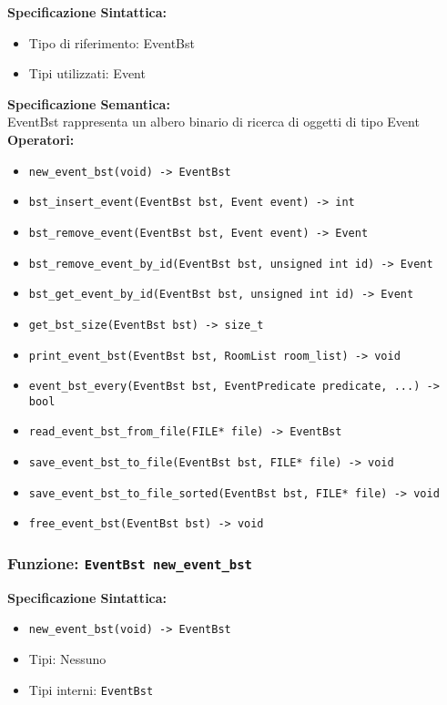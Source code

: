 \documentclass[11pt]{scrartcl} %
\begin{document}
\textbf{Specificazione Sintattica:}
\begin{itemize}
	\item Tipo di riferimento: EventBst
	\item Tipi utilizzati: Event
\end{itemize}
\textbf{Specificazione Semantica:} \\
EventBst rappresenta un albero binario di ricerca di oggetti di tipo Event\\

\textbf{Operatori:}
\begin{itemize}
    \item \texttt{new\_event\_bst(void) -> EventBst}
    \item \texttt{bst\_insert\_event(EventBst bst, Event event) -> int}
    \item \texttt{bst\_remove\_event(EventBst bst, Event event) -> Event}
    \item \texttt{bst\_remove\_event\_by\_id(EventBst bst, unsigned int id) -> Event}
    \item \texttt{bst\_get\_event\_by\_id(EventBst bst, unsigned int id) -> Event}
    \item \texttt{get\_bst\_size(EventBst bst) -> size\_t}
    \item \texttt{print\_event\_bst(EventBst bst, RoomList room\_list) -> void}
    \item \texttt{event\_bst\_every(EventBst bst, EventPredicate predicate, ...) -> bool}
    \item \texttt{read\_event\_bst\_from\_file(FILE* file) -> EventBst}
    \item \texttt{save\_event\_bst\_to\_file(EventBst bst, FILE* file) -> void}
    \item \texttt{save\_event\_bst\_to\_file\_sorted(EventBst bst, FILE* file) -> void}
    \item \texttt{free\_event\_bst(EventBst bst) -> void}
\end{itemize}


\subsubsection{Funzione: \texttt{EventBst new\_event\_bst}}

\textbf{Specificazione Sintattica:}
\begin{itemize}
\item \texttt{new\_event\_bst(void) -> EventBst}
\item Tipi: Nessuno
\item Tipi interni: \texttt{EventBst}
\end{itemize}
\end{document}
